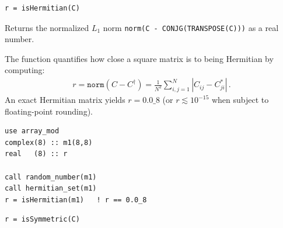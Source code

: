 
\lstset{language=[95]Fortran}
\begin{lstlisting}
r = isHermitian(C)
\end{lstlisting}

Returns the normalized $L_1$ norm \texttt{norm(C - CONJG(TRANSPOSE(C)))} as a real number.

The function  quantifies how close a square  matrix  is to being Hermitian by computing:
\begin{align}
  r = \texttt{norm}(C - C^\dagger) = \frac{1}{N^2}\sum_{i,j=1}^{N} \left|C_{ij} - C_{ji}^*\right|\, .
\end{align}
An exact Hermitian matrix yields $r = 0.0\_8$ (or $r \lesssim 10^{-15}$ when subject to floating-point rounding).

\begin{description}[leftmargin=2.2cm, style=nextline]
\end{description}

\lstset{language=[95]Fortran}
\begin{lstlisting}
use array_mod
complex(8) :: m1(8,8)
real   (8) :: r

call random_number(m1)
call hermitian_set(m1)
r = isHermitian(m1)   ! r == 0.0_8
\end{lstlisting}


\lstset{language=[95]Fortran}
\begin{lstlisting}
r = isSymmetric(C)
\end{lstlisting}

